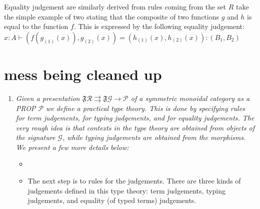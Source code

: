 \documentclass[pra,floatfix,
amsmath,superscriptaddress, 12pt]{article}
\theoremstyle{definition}
\newcommand{\mc}[1]{\mathcal{#1}}
\begin{document}
Equality judgement are similarly derived from rules coming from the set $R$ take the simple example of two stating that the composite of two functions $g$ and $h$ is equal to the function $f$. This is expressed by the following equality judgement: $x:A\vdash\left(f\left(g_{\left(1\right)}\left(x\right)\right),g_{\left(2\right)}\left(x\right)\right)=\left(h_{\left(1\right)}\left(x\right),h_{\left(2\right)}\left(x\right)\right):\left(B_{1},B_{2}\right)$

\section{mess being cleaned up}


\begin{enumerate}
    \item \textit{Given a presentation $\mathfrak{F}\mathcal{R} \rightrightarrows\mathfrak{F}\mathcal{G}\rightarrow \mc{P}$
 of a symmetric monoidal category as a PROP $\mc{P}$ we define a practical type theory. This is done by specifying rules for term judgements, for typing judgements, and for equality judgements. The very rough idea is that contexts in the type theory are obtained from objects of the signature $\mc{G}$, while typing judgements are obtained from the morphisms. We present a few more details below:}
 \begin{itemize}
    \item %
    
    \item The next step is to rules for the judgements. There are three kinds of judgements defined in this type theory: term judgements, typing judgements, and equality (of typed terms) judgements. 
    

\end{itemize}
\end{enumerate}
\end{document}
